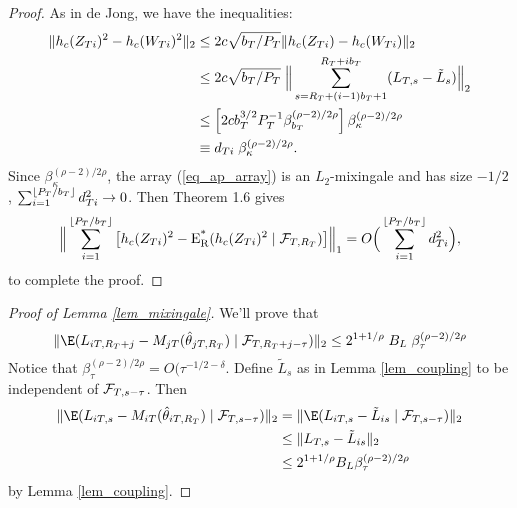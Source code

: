 \documentclass[11pt]{article} \def\baselinestretch{1.08}
\begin{document}
\begin{proof}
As in de Jong, we have the inequalities:
\begin{align*}
  \|h_c(Z_{Ti})^2 - h_c(W_{Ti})^2\|_2 
  & \leq 2 c \sqrt{b_T/P_T} \| h_c(Z_{Ti}) - h_c(W_{Ti}) \|_2 \\
  & \leq 2 c \sqrt{b_T/P_T} \; \Big\| 
    \sum_{s=R_T + (i-1)b_T + 1}^{R_T + i b_T} (L_{{}T,{s}} - \tilde
  L_s)\Big\|_2 \\
  & \leq \left[2 c b_T^{3/2} P_T^{-1} \beta_{b_T}^{(\rho -
  2)/2\rho}\right] \beta_\kappa^{(\rho - 2)/2\rho}\\
  &\equiv d_{Ti} \; \beta_\kappa^{(\rho - 2)/2\rho}.
\end{align*}
Since $\beta_\kappa^{(\rho - 2)/2\rho}$, the array (\ref{eq_ap_array})
is an $L_2$-mixingale and has size $-1/2$, $\sum_{i=1}^{\lfloor P_T/b_T \rfloor} 
d_{Ti}^2 \to 0$.  Then  Theorem 1.6
gives
\[
  \Big\| \sum_{i=1}^{\lfloor P_T/b_T \rfloor} \big[h_c(Z_{Ti})^2 - \operatorname{E^*_R}(h_c(Z_{Ti})^2
  \mid\mathcal F_{T,{R_T}})\big] \Big\|_1 =
  O\Big(\sum_{i=1}^{\lfloor P_T/b_T \rfloor} d_{Ti}^2\Big),
\]
to complete the proof.
\end{proof}

\begin{proof}[Proof of Lemma \ref{lem_mixingale}]
We'll prove that 
\[
  \| \E(\fT{i}{R_T+j} - \mmrT{j} \mid \FT{R_T+j-\tau}) \|_2 
  \leq 2^{1+1/\rho} \; B_L \; \beta_\tau^{(\rho-2)/2\rho}
\]
Notice that $\beta_\tau^{(\rho-2)/2\rho} =
O(\tau^{-1/2-\delta}$. Define 
$\tilde L_s$ as in Lemma \ref{lem_coupling} to be independent of
$\mathcal F_{T,{s-\tau}}$.  Then
\begin{align*} \label{eq_mixingale_bound_1}
  \| \E(\fT{i}{s} - \mmrT{i} \mid \FT{s-\tau}) \|_2 
  & = \| \E(\fT{i}{s} - \tilde L_{is} \mid \FT{s-\tau}) \|_2 \\
  & \leq \| \fT{}{s} - \tilde L_{is} \|_2 \\
  & \leq 2^{1+1/\rho} B_L \beta_\tau^{(\rho-2)/2\rho}
\end{align*}
by Lemma \ref{lem_coupling}.
\end{proof}
\end{document}
